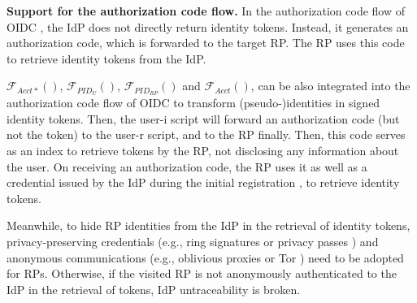 



\noindent \textbf{Support for the authorization code flow.} In the authorization code flow of OIDC \cite{OpenIDConnect}, the IdP does not directly return identity tokens.
Instead, it generates an authorization code, which is forwarded to the target RP.
The RP uses this code to retrieve identity tokens from the IdP.

$\mathcal{F}_{Acct\ast}()$, $\mathcal{F}_{PID_{U}}()$, $\mathcal{F}_{PID_{RP}}()$ and $\mathcal{F}_{Acct}()$, can be also integrated into the authorization code flow of OIDC to transform (pseudo-)identities in signed identity tokens.
Then, the user-i script will forward an authorization code (but not the token) to the user-r script, and to the RP finally.
Then, this code serves as an index to retrieve tokens by the RP, not disclosing any information about the user.
On receiving an authorization code, the RP uses it as well as a credential issued by the IdP during the initial registration \cite{OpenIDConnect}, to retrieve identity tokens.

Meanwhile, to hide RP identities from the IdP in the retrieval of identity tokens, privacy-preserving credentials
    (e.g., ring signatures \cite{ring-sig} or privacy passes \cite{privacypass,trusttoken})
 and anonymous communications (e.g., oblivious proxies \cite{ohttp-rfc} or Tor \cite{tor}) need to be adopted for RPs.
Otherwise, if the visited RP is not anonymously authenticated to the IdP in the retrieval of tokens,
    IdP untraceability is broken.

